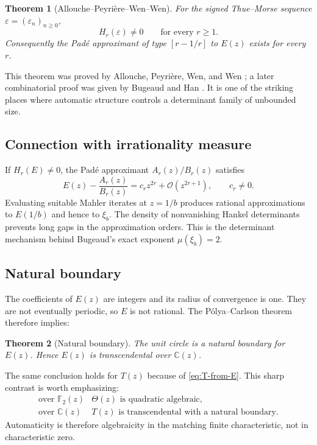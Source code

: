 \documentclass[11pt,oneside]{article}
\newtheorem{theorem}{Theorem}[section]
\theoremstyle{definition}
\theoremstyle{remark}
\newcommand{\C}{\mathbb C}
\newcommand{\Ftwo}{\mathbb F_2}
\newcommand{\bigO}{\mathcal O}
\newcommand{\eps}{\varepsilon}
\begin{document}
\begin{theorem}[Allouche--Peyri\`ere--Wen--Wen]\label{thm:APWW}
For the signed Thue--Morse sequence $\eps=(\eps_n)_{n\ge0}$,
\begin{equation}\label{eq:hankel-nonzero}
 H_r(\eps)\ne0
 \qquad\text{for every }r\ge1.
\end{equation}
Consequently the Pad\'e approximant of type $[r-1/r]$ to $E(z)$ exists for
every $r$.
\end{theorem}

This theorem was proved by Allouche, Peyri\`ere, Wen, and Wen
\cite{apww1998}; a later combinatorial proof was given by Bugeaud and Han
\cite{bugeaudhan2014}.  It is one of the striking places where automatic
structure controls a determinant family of unbounded size.

\subsection{Connection with irrationality measure}

If $H_r(E)\ne0$, the Pad\'e approximant $A_r(z)/B_r(z)$ satisfies
\begin{equation}\label{eq:pade-order}
 E(z)-\frac{A_r(z)}{B_r(z)}
 =c_rz^{2r}+\bigO(z^{2r+1}),
 \qquad c_r\ne0.
\end{equation}
Evaluating suitable Mahler iterates at $z=1/b$ produces rational
approximations to $E(1/b)$ and hence to $\xi_b$.  The density of nonvanishing
Hankel determinants prevents long gaps in the approximation orders.  This is
the determinant mechanism behind Bugeaud's exact exponent
$\mu(\xi_b)=2$.

\subsection{Natural boundary}

The coefficients of $E(z)$ are integers and its radius of convergence is one.
They are not eventually periodic, so $E$ is not rational.  The
P\'olya--Carlson theorem \cite{carlson1921} therefore implies:

\begin{theorem}[Natural boundary]\label{thm:natural-boundary}
The unit circle is a natural boundary for $E(z)$.  Hence $E(z)$ is
transcendental over $\C(z)$.
\end{theorem}

The same conclusion holds for $T(z)$ because of \cref{eq:T-from-E}.  This
sharp contrast is worth emphasizing:
\begin{equation}\label{eq:char-contrast}
 \begin{array}{c|c}
 \text{over }\Ftwo(z)&\Theta(z)\text{ is quadratic algebraic},\\
 \text{over }\C(z)&T(z)\text{ is transcendental with a natural boundary}.
 \end{array}
\end{equation}
Automaticity is therefore algebraicity in the matching finite characteristic,
not in characteristic zero.
\end{document}
